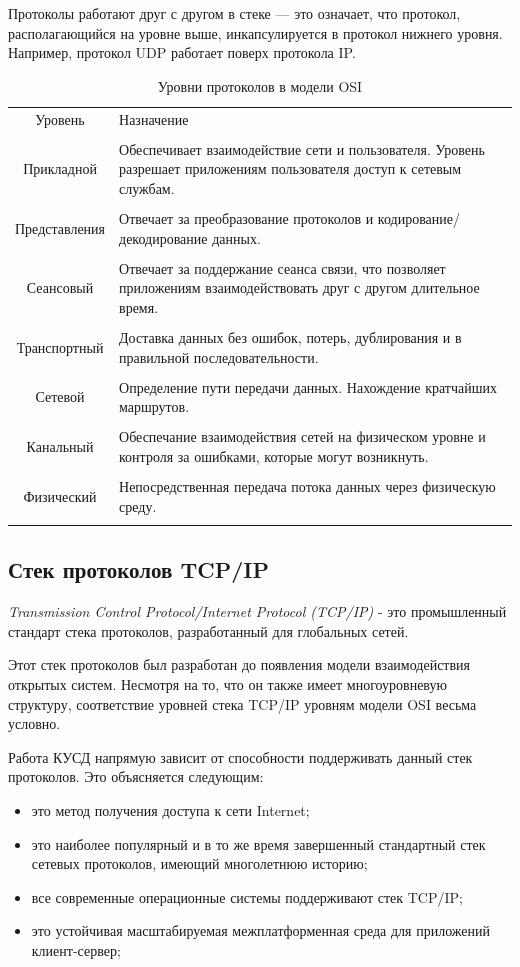 Протоколы работают друг с другом в стеке --- это означает, что протокол, располагающийся на уровне выше, инкапсулируется в протокол нижнего уровня. Например, протокол UDP работает поверх протокола IP.

\begin{table}[h!]
\caption{Уровни протоколов в модели OSI}
\label{osi}
	\begin{tabular}{|c| >{\centering} m{120mm} <{\centering}|}
	\hline
	Уровень & Назначение \\
	\tabularnewline
	\hline
	Прикладной & Обеспечивает взаимодействие сети и пользователя. Уровень разрешает приложениям пользователя доступ к сетевым службам.\\
	\tabularnewline
	\hline
	Представления & Отвечает за преобразование протоколов и кодирование/декодирование данных.\\
	\tabularnewline
	\hline	
	Сеансовый & Отвечает за поддержание сеанса связи, что позволяет приложениям взаимодействовать друг с другом длительное время.\\
	\tabularnewline
	\hline
	Транспортный & Доставка данных без ошибок, потерь, дублирования и в правильной последовательности.\\
	\tabularnewline
	\hline
	Сетевой & Определение пути передачи данных. Нахождение кратчайших маршрутов.\\
	\tabularnewline
	\hline
	Канальный & Обеспечание взаимодействия сетей на физическом уровне и контроля за ошибками, которые могут возникнуть.\\
	\tabularnewline
	\hline
	Физический & Непосредственная передача потока данных через физическую среду.\\
	\tabularnewline
	\hline 
	\end{tabular}
\end{table}

\subsection{Стек протоколов TCP/IP}

\textit{Transmission Control Protocol/Internet Protocol (TCP/IP)} - это промышленный стандарт стека протоколов, разработанный для глобальных сетей\cite{tcpip}.

Этот стек протоколов был разработан до появления модели взаимодействия открытых систем. Несмотря на то, что он также имеет многоуровневую структуру, соответствие уровней стека TCP/IP уровням модели OSI весьма условно.

Работа КУСД напрямую зависит от способности поддерживать данный стек протоколов\label{reasonofwork}. Это объясняется следующим:
\begin{itemize}
\item это метод получения доступа к сети Internet;
\item это наиболее популярный и в то же время завершенный стандартный стек сетевых протоколов, имеющий многолетнюю историю;
\item все современные операционные системы поддерживают стек TCP/IP;
\item это устойчивая масштабируемая межплатформенная среда для приложений клиент-сервер;
\end{itemize}

